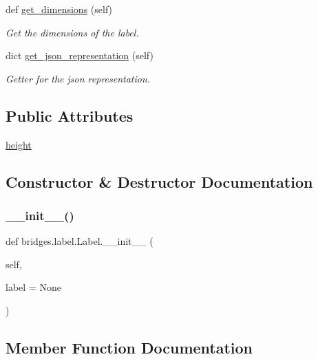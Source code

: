 \begin{DoxyCompactItemize}
def \mbox{\hyperlink{classbridges_1_1label_1_1_label_a627bc596c7e3db837e3b1575282e1b98}{get\+\_\+dimensions}} (self)
\begin{DoxyCompactList}\small\item\em Get the dimensions of the label. \end{DoxyCompactList}\item 
dict \mbox{\hyperlink{classbridges_1_1label_1_1_label_a71d085a24859764dbe5cf4848f74baef}{get\+\_\+json\+\_\+representation}} (self)
\begin{DoxyCompactList}\small\item\em Getter for the json representation. \end{DoxyCompactList}\end{DoxyCompactItemize}
\subsection*{Public Attributes}
\begin{DoxyCompactItemize}
\item 
\mbox{\hyperlink{classbridges_1_1label_1_1_label_a2bf622aa77b4ad7d6918db99a8bfd4da}{height}}
\end{DoxyCompactItemize}


\subsection{Constructor \& Destructor Documentation}
\mbox{\label{classbridges_1_1label_1_1_label_a9a6a9ba4ccb2757f0577d741d730c95c}} 
\subsubsection{\texorpdfstring{\_\_init\_\_()}{\_\_init\_\_()}}
{\footnotesize\ttfamily def bridges.\+label.\+Label.\+\_\+\+\_\+init\+\_\+\+\_\+ (\begin{DoxyParamCaption}\item[{}]{self,  }\item[{}]{label = {\ttfamily None} }\end{DoxyParamCaption})}



\subsection{Member Function Documentation}
\mbox{\label{classbridges_1_1label_1_1_label_aad034d601eefef042451587028123668}} 
